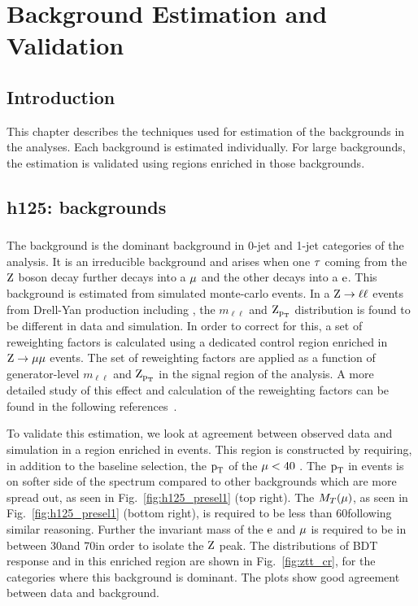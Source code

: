 \chapter{Background Estimation and Validation}
\label{bg_val}
\section{Introduction}
This chapter describes the techniques used for estimation of the backgrounds in the analyses. Each background is estimated individually. For large backgrounds, the estimation is validated using regions enriched in those backgrounds.

\section{h125: \hmue backgrounds}
\label{h125_bg_val}

\subsection{\ztt}
\label{h125_ztt}
The \ztt background is the dominant background in 0-jet and 1-jet categories of the analysis. It is an irreducible background and arises when one $\tau$ coming from the $\text{Z}$ boson decay further decays into a $\mu$ and the other decays into a $\text{e}$. This background is estimated from simulated monte-carlo events. In a $\text{Z} \to \ell \ell$ events from Drell-Yan production including \ztt, the $m_{\ell\ell}$ and $\text{Z}_{\text{p}_\text{T}}$ distribution is found to be different in data and simulation. In order to correct for this, a set of reweighting factors is calculated using a dedicated control region enriched in $\text{Z} \to \mu\mu$ events. The set of reweighting factors are applied as a function of generator-level $m_{\ell\ell}$ and $\text{Z}_{\text{p}_\text{T}}$ in the signal region of the analysis. A more detailed study of this effect and calculation of the reweighting factors can be found in the following references~\cite{CMS-PAS-HIG-16-043}.

To validate this estimation, we look at agreement between observed data and simulation in a region enriched in \ztt events. This region is constructed by requiring, in addition to the baseline selection,  the $\text{p}_\text{T}$ of the $\mu<40$ \GeV. The $\text{p}_\text{T}$ in \ztt events is on softer side of the spectrum compared to other backgrounds which are more spread out, as seen in Fig.~\ref{fig:h125_presel1} (top right). The $M_T(\mu)$, as seen in Fig.~\ref{fig:h125_presel1} (bottom right), is required to be less than 60\GeV following similar reasoning. Further the invariant mass of the $\text{e}$ and $\mu$ is required to be in between 30\GeV and 70\GeV in order to isolate the $\text{Z}$ peak. The distributions of BDT response and \mcol in this \ztt enriched region are shown in Fig.~\ref{fig:ztt_cr}, for the categories where this background is dominant. The plots show good agreement between data and background.




